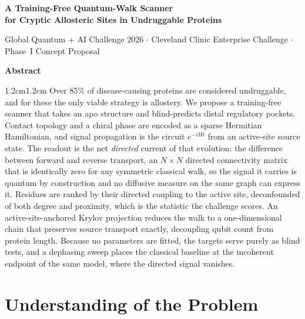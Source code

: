 \documentclass[10pt,a4paper]{article}
\begin{document}
\begin{center}
  {\LARGE\bfseries A Training-Free Quantum-Walk Scanner\\[0.25em]
   for Cryptic Allosteric Sites in Undruggable Proteins\par}
  \vspace{0.9em}
  {\small Global Quantum + AI Challenge 2026 $\cdot$ Cleveland Clinic Enterprise Challenge
   $\cdot$ Phase~I Concept Proposal\par}
\end{center}
\vspace{0.6em}

\begin{center}\textbf{Abstract}\end{center}
\begin{adjustwidth}{1.2cm}{1.2cm}
\small
Over 85\% of disease-causing proteins are considered undruggable, and for these the only viable
strategy is allostery. We propose a training-free scanner that takes an apo structure and
blind-predicts distal regulatory pockets. Contact topology and a chiral phase are encoded as a sparse
Hermitian Hamiltonian, and signal propagation is the circuit $e^{-iHt}$ from an active-site source
state. The readout is the net \emph{directed} current of
that evolution: the difference between forward and reverse transport, an $N\times N$ directed
connectivity matrix that is identically zero for any symmetric classical walk, so the signal it
carries is quantum by construction and no diffusive measure on the same graph can express it.
Residues are ranked by their directed coupling to the active site, deconfounded of both degree and
proximity, which is the statistic the challenge scores. An active-site-anchored Krylov projection
reduces the walk to a one-dimensional chain that preserves source transport exactly, decoupling qubit
count from protein length. Because no parameters are fitted, the targets serve purely as blind tests,
and a dephasing sweep places the classical baseline at the incoherent endpoint of the same model,
where the directed signal vanishes.
\end{adjustwidth}
\vspace{0.5em}

\section{Understanding of the Problem}
\end{document}
